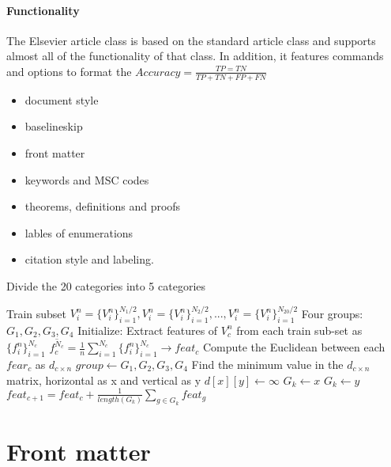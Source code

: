 \documentclass[review]{elsarticle}
\begin{document}
\paragraph{Functionality} The Elsevier article class is based on the standard article class and supports almost all of the functionality of that class. In addition, it features commands and options to format the
$Accuracy =  \frac{TP = TN}{TP + TN + FP + FN}$


\begin{itemize}
\item document style
\item baselineskip
\item front matter
\item keywords and MSC codes
\item theorems, definitions and proofs
\item lables of enumerations
\item citation style and labeling.
\end{itemize}

\begin{algorithm}
    \caption{Divide the 20 categories into 5 categories}
    \begin{algorithmic}[1]
    \Require Train subset $V^n_i = \{V^n_i\}^{N_1/2}_{i=1}, V^n_i = \{V^n_i\}^{N_2/2}_{i=1}, ..., V^n_i = \{V^n_i\}^{N_{20}/2}_{i=1}$
    \Ensure Four groups: $G_1, G_2, G_3, G_4$
    \State Initialize: Extract features of $V_c^n$ from each train sub-set as $\{f_i^n \}_{i=1}^{N_c}$
    \State $ \overline{f^{N_c}_c} = \frac{1}{n}\sum\limits_{i=1}^{N_c}\{f^n_i\}^{N_c}_{i=1}\rightarrow feat_c $
    \State Compute the Euclidean between each $fear_c$ as $d_{c\times n}$
	    \State $group \leftarrow G_1, G_2, G_3, G_4$
		    \State Find the minimum value in the $d_{c\times n}$ matrix, horizontal as x and vertical as y
		    \State $d[x][y] \leftarrow \infty$
			    \State $G_k \leftarrow x$
		    \EndIf
			    \State $G_k \leftarrow y$
		    \EndIf
		    	\State $ feat_{c+1} = feat_c + \frac{1}{length(G_k)}\sum \limits_{g\in   G_k}feat_g$
         	\EndIf
        \EndWhile
    \EndFor

    \end{algorithmic}
\end{algorithm}


\section{Front matter}
\end{document}
